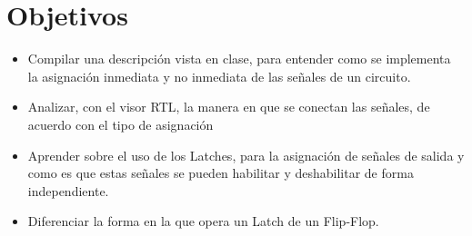 \section{Objetivos \label{sec:obj}}


\begin{itemize} 
	\item Compilar una descripción vista en clase, para entender como se implementa la asignación inmediata y no inmediata de las señales de un circuito.
	
	\item Analizar, con el visor RTL, la manera en que se conectan las señales, de acuerdo con el tipo de asignación
	
	\item Aprender sobre el uso de los Latches, para la asignación de señales de salida y como es que estas señales se pueden habilitar y deshabilitar de forma independiente.
	
	\item Diferenciar la forma en la que opera un Latch de un Flip-Flop.
\end{itemize}